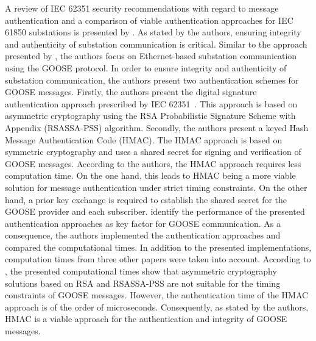 A review of IEC 62351 security recommendations with regard to message authentication and a comparison of viable authentication approaches for IEC 61850 substations is presented by \citeauthor{Elbez2019} \cite{Elbez2019}.
As stated by the authors, ensuring integrity and authenticity of substation communication is critical.
Similar to the approach presented by \citeauthor{Ishchenko2018}, the authors focus on Ethernet-based substation communication using the GOOSE protocol.
In order to ensure integrity and authenticity of substation communication, the authors present two authentication schemes for GOOSE messages.
Firstly, the authors present the digital signature authentication approach prescribed by IEC 62351~\cite{IEC62351P6}.
This approach is based on asymmetric cryptography using the RSA Probabilistic Signature Scheme with Appendix (RSASSA-PSS) algorithm.
Secondly, the authors present a keyed Hash Message Authentication Code (HMAC).
The HMAC approach is based on symmetric cryptography and uses a shared secret for signing and verification of GOOSE messages.
According to the authors, the HMAC approach requires less computation time.
On the one hand, this leads to HMAC being a more viable solution for message authentication under strict timing constraints.
On the other hand, a prior key exchange is required to establish the shared secret for the GOOSE provider and each subscriber.
\citeauthor{Elbez2019} identify the performance of the presented authentication approaches as key factor for GOOSE communication.
As a consequence, the authors implemented the authentication approaches and compared the computational times.
In addition to the presented implementations, computation times from three other papers were taken into account.
According to \citeauthor{Elbez2019}, the presented computational times show that asymmetric cryptography solutions based on RSA and RSASSA-PSS are not suitable for the timing constraints of GOOSE messages.
However, the authentication time of the HMAC approach is of the order of microseconds.
Consequently, as stated by the authors, HMAC is a viable approach for the authentication and integrity of GOOSE messages.

